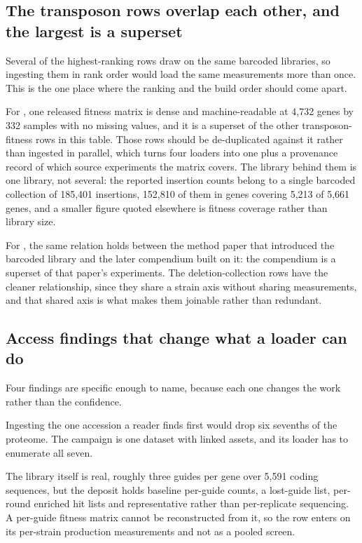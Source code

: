 \subsection{The transposon rows overlap each other, and the largest is a superset}\label{sec:overlap}

Several of the highest-ranking rows draw on the same barcoded libraries, so ingesting them
in rank order would load the same measurements more than once. This is the one place where
the ranking and the build order should come apart.

For , one released fitness matrix is dense and machine-readable at 4,732
genes by 332 samples with no missing values, and it is a superset of the other
transposon-fitness rows in this table. Those rows should be de-duplicated against it
rather than ingested in parallel, which turns four loaders into one plus a provenance
record of which source experiments the matrix covers. The library behind them is one
library, not several: the reported insertion counts belong to a single barcoded collection
of 185,401 insertions, 152,810 of them in genes covering 5,213 of 5,661 genes, and a
smaller figure quoted elsewhere is fitness coverage rather than library size.

For , the same relation holds between the method paper that introduced the
barcoded library and the later compendium built on it: the compendium is a superset of that
paper's  experiments. The deletion-collection rows have the cleaner
relationship, since they share a strain axis without sharing measurements, and that shared
axis is what makes them joinable rather than redundant.

\subsection{Access findings that change what a loader can do}\label{sec:access}

Four findings are specific enough to name, because each one changes the work rather than
the confidence.

 Ingesting the one accession a reader finds first would
drop six sevenths of the proteome. The campaign is one dataset with linked assets, and its
loader has to enumerate all seven.

 The library itself is real, roughly three guides per gene over 5,591 coding
sequences, but the deposit holds baseline per-guide counts, a lost-guide list, per-round
enriched hit lists and representative rather than per-replicate sequencing. A per-guide
fitness matrix cannot be reconstructed from it, so the row enters on its per-strain
production measurements and not as a pooled screen.

